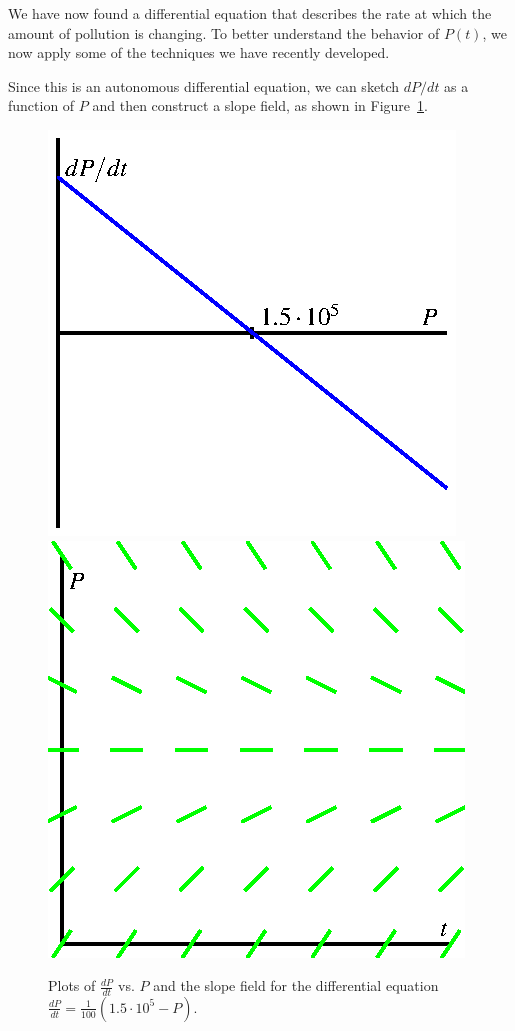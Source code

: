 We have now found a differential equation that describes the rate
at which the amount of pollution is changing.  To better understand the
behavior of $P(t)$, we now apply some
of the techniques we have recently developed.

Since this is an autonomous differential equation, we can sketch
$dP/dt$ as a function of $P$ and then construct a slope field, as shown in Figure~\ref{F:7.5.Ex1}.

\begin{figure}[h]
\begin{center}
  \includegraphics{figures/7_5_lake_michigan.eps}\qquad
  \includegraphics{figures/7_5_slope_field.eps}
\caption{Plots of $\frac{dP}{dt}$ vs. $P$ and the slope field for the differential equation $\frac{dP}{dt} = \frac{1}{100}(1.5\cdot10^{5} - P)$.} \label{F:7.5.Ex1}
\end{center}
\end{figure}

